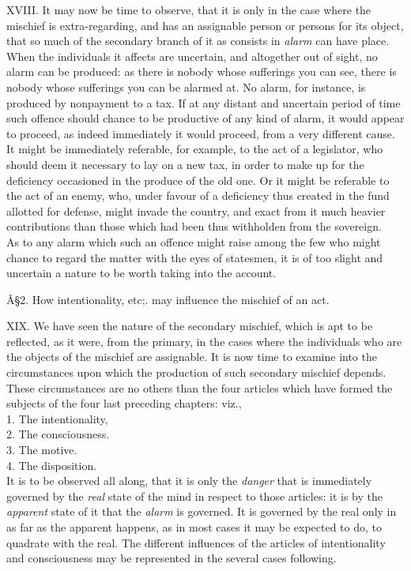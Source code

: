 \documentclass[12pt]{report}
\begin{document}
XVIII. It may now be time to observe, that it is only in the case where
the mischief is extra-regarding, and has an assignable person or persons
for its object, that so much of the secondary branch of it as consists
in \emph{alarm} can have place. When the individuals it affects are
uncertain, and altogether out of sight, no alarm can be produced: as
there is nobody whose sufferings you can see, there is nobody whose
sufferings you can be alarmed at. No alarm, for instance, is produced by
nonpayment to a tax. If at any distant and uncertain period of time such
offence should chance to be productive of any kind of alarm, it would
appear to proceed, as indeed immediately it would proceed, from a very
different cause. It might be immediately referable, for example, to the
act of a legislator, who should deem it necessary to lay on a new tax,
in order to make up for the deficiency occasioned in the produce of the
old one. Or it might be referable to the act of an enemy, who, under
favour of a deficiency thus created in the fund allotted for defense,
might invade the country, and exact from it much heavier contributions
than those which had been thus withholden from the sovereign.\\
As to any alarm which such an offence might raise among the few who
might chance to regard the matter with the eyes of statesmen, it is of
too slight and uncertain a nature to be worth taking into the account.

Â§2. How intentionality, etc;. may influence the mischief of an act.

XIX. We have seen the nature of the secondary mischief, which is apt to
be reflected, as it were, from the primary, in the cases where the
individuals who are the objects of the mischief are assignable. It is
now time to examine into the circumstances upon which the production of
such secondary mischief depends. These circumstances are no others than
the four articles which have formed the subjects of the four last
preceding chapters: viz.,\\
1. The intentionality,\\
2. The consciousness.\\
3. The motive.\\
4. The disposition.\\
It is to be observed all along, that it is only the \emph{danger} that
is immediately governed by the \emph{real} state of the mind in respect
to those articles: it is by the \emph{apparent} state of it that the
\emph{alarm} is governed. It is governed by the real only in as far as
the apparent happens, as in most cases it may be expected to do, to
quadrate with the real. The different influences of the articles of
intentionality and consciousness may be represented in the several cases
following.
\end{document}
